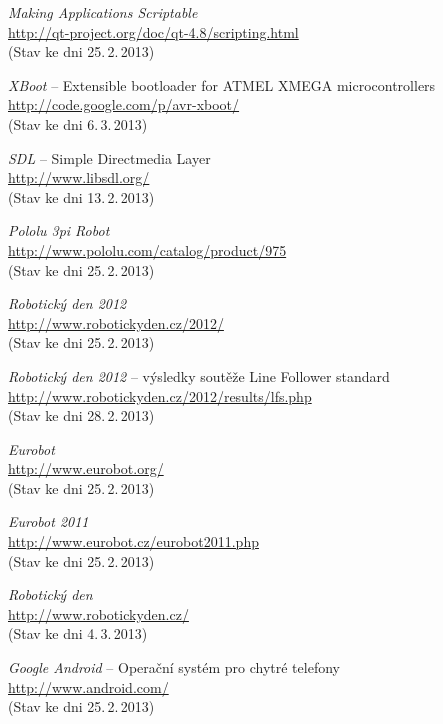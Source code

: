\documentclass[12pt, a4paper, oneside]{article}
\newcommand{\It}{\textit}  %
\begin{document}
\begin{thebibliography}{99}
     \It{Making Applications Scriptable} \\
    \url{http://qt-project.org/doc/qt-4.8/scripting.html}\\
    (Stav ke dni 25.\,2.\,2013)

     \It{XBoot} -- Extensible bootloader for ATMEL XMEGA microcontrollers \\
    \url{http://code.google.com/p/avr-xboot/}\\
    (Stav ke dni 6.\,3.\,2013)

     \It{SDL} -- Simple Directmedia Layer \\
    \url{http://www.libsdl.org/}\\
    (Stav ke dni 13.\,2.\,2013)

     \It{Pololu 3pi Robot} \\
    \url{http://www.pololu.com/catalog/product/975}\\
    (Stav ke dni 25.\,2.\,2013)

     \It{Robotický den 2012} \\
    \url{http://www.robotickyden.cz/2012/}\\
    (Stav ke dni 25.\,2.\,2013)

     \It{Robotický den 2012} -- výsledky soutěže Line Follower standard\\
    \url{http://www.robotickyden.cz/2012/results/lfs.php}\\
    (Stav ke dni 28.\,2.\,2013)

     \It{Eurobot} \\
    \url{http://www.eurobot.org/}\\
    (Stav ke dni 25.\,2.\,2013)

     \It{Eurobot 2011} \\
    \url{http://www.eurobot.cz/eurobot2011.php}\\
    (Stav ke dni 25.\,2.\,2013)

     \It{Robotický den} \\
    \url{http://www.robotickyden.cz/}\\
    (Stav ke dni 4.\,3.\,2013)

     \It{Google Android} -- Operační systém pro chytré telefony\\
    \url{http://www.android.com/}\\
    (Stav ke dni 25.\,2.\,2013)


\end{thebibliography}
\end{document}
